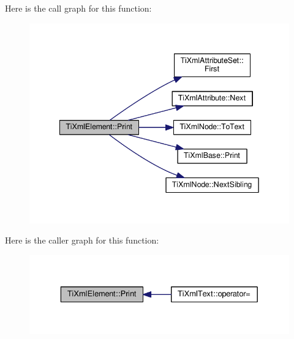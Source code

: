 Here is the call graph for this function\+:\nopagebreak
\begin{figure}[H]
\begin{center}
\leavevmode
\includegraphics[width=342pt]{class_ti_xml_element_ad9d0c008866982ab8d9aafae7e14d692_cgraph}
\end{center}
\end{figure}




Here is the caller graph for this function\+:\nopagebreak
\begin{figure}[H]
\begin{center}
\leavevmode
\includegraphics[width=329pt]{class_ti_xml_element_ad9d0c008866982ab8d9aafae7e14d692_icgraph}
\end{center}
\end{figure}


